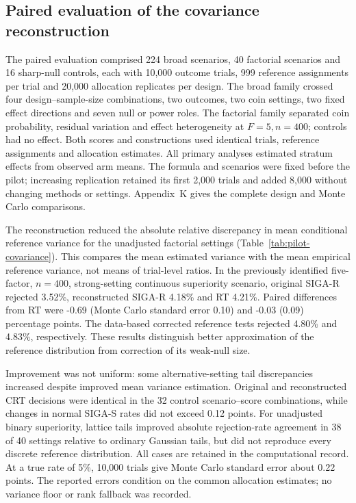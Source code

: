 \documentclass[12pt,a4paper]{article}
\theoremstyle{definition}
\begin{document}
\subsection{Paired evaluation of the covariance reconstruction}
The paired evaluation comprised 224 broad scenarios, 40 factorial scenarios and 16 sharp-null controls, each with 10,000 outcome trials, 999 reference assignments per trial and 20,000 allocation replicates per design. The broad family crossed four design--sample-size combinations, two outcomes, two coin settings, two fixed effect directions and seven null or power roles. The factorial family separated coin probability, residual variation and effect heterogeneity at $F=5,n=400$; controls had no effect. Both scores and constructions used identical trials, reference assignments and allocation estimates. All primary analyses estimated stratum effects from observed arm means. The formula and scenarios were fixed before the pilot; increasing replication retained its first 2,000 trials and added 8,000 without changing methods or settings. Appendix~K gives the complete design and Monte Carlo comparisons.

The reconstruction reduced the absolute relative discrepancy in mean conditional reference variance for the unadjusted factorial settings (Table~\ref{tab:pilot-covariance}). This compares the mean estimated variance with the mean empirical reference variance, not means of trial-level ratios. In the previously identified five-factor, $n=400$, strong-setting continuous superiority scenario, original SIGA-R rejected 3.52\%, reconstructed SIGA-R 4.18\% and RT 4.21\%. Paired differences from RT were -0.69 (Monte Carlo standard error 0.10) and -0.03 (0.09) percentage points. The data-based corrected reference tests rejected 4.80\% and 4.83\%, respectively. These results distinguish better approximation of the reference distribution from correction of its weak-null size.

Improvement was not uniform: some alternative-setting tail discrepancies increased despite improved mean variance estimation. Original and reconstructed CRT decisions were identical in the 32 control scenario--score combinations, while changes in normal SIGA-S rates did not exceed 0.12 points. For unadjusted binary superiority, lattice tails improved absolute rejection-rate agreement in 38 of 40 settings relative to ordinary Gaussian tails, but did not reproduce every discrete reference distribution. All cases are retained in the computational record. At a true rate of 5\%, 10,000 trials give Monte Carlo standard error about 0.22 points. The reported errors condition on the common allocation estimates; no variance floor or rank fallback was recorded.
\end{document}
